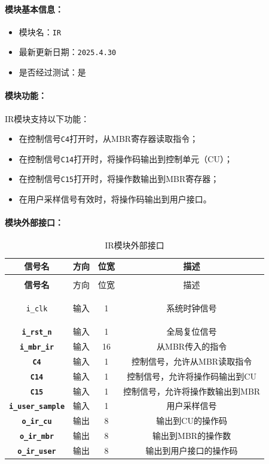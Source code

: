 \documentclass[lang=cn,a4paper,newtx]{elegantpaper}
\begin{document}
\paragraph{模块基本信息：}
\begin{itemize}
  \item 模块名：\texttt{IR}
  \item 最新更新日期：\texttt{2025.4.30}
  \item 是否经过测试：是
\end{itemize}

\paragraph{模块功能：}
IR模块支持以下功能：
\begin{itemize}
  \item 在控制信号\texttt{C4}打开时，从MBR寄存器读取指令；
  \item 在控制信号\texttt{C14}打开时，将操作码输出到控制单元（CU）；
  \item 在控制信号\texttt{C15}打开时，将操作数输出到MBR寄存器；
  \item 在用户采样信号有效时，将操作码输出到用户接口。
\end{itemize}

\paragraph{模块外部接口：}
\begin{longtable}{>{\bfseries}c c c c}
  \caption{IR模块外部接口} \\ 
  \toprule
  信号名 & 方向 & 位宽 & 描述 \\ 
  \midrule
  \endfirsthead

  \multicolumn{4}{l}{\textbf{（续表）IR模块外部接口}} \\ 
  \toprule
  信号名 & 方向 & 位宽 & 描述 \\ 
  \midrule
  \endhead

  \texttt{i\_clk} & 输入 & 1 & 系统时钟信号 \\ 
  \texttt{i\_rst\_n} & 输入 & 1 & 全局复位信号 \\ 
  \texttt{i\_mbr\_ir} & 输入 & 16 & 从MBR传入的指令 \\ 
  \texttt{C4} & 输入 & 1 & 控制信号，允许从MBR读取指令 \\ 
  \texttt{C14} & 输入 & 1 & 控制信号，允许将操作码输出到CU \\ 
  \texttt{C15} & 输入 & 1 & 控制信号，允许将操作数输出到MBR \\ 
  \texttt{i\_user\_sample} & 输入 & 1 & 用户采样信号 \\ 
  \texttt{o\_ir\_cu} & 输出 & 8 & 输出到CU的操作码 \\ 
  \texttt{o\_ir\_mbr} & 输出 & 8 & 输出到MBR的操作数 \\ 
  \texttt{o\_ir\_user} & 输出 & 8 & 输出到用户接口的操作码 \\ 
  \bottomrule
\end{longtable}
\end{document}
